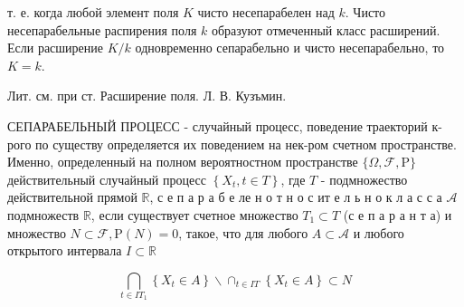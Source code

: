\documentclass[10pt]{article}
\begin{document}
т. е. когда любой элемент поля $K$ чисто несепарабелен над $k$. Чисто несепарабельные распирения поля $k$ образуют отмеченный класс расширений. Если расширение $K / k$ одновременно сепарабельно и чисто несепарабельно, то $K=k$.



Лит. см. при ст. Расширение поля. Л. В. Кузъмин.



СЕПАРАБЕЛЬНЫЙ ПРОЦЕСС - случайный процесс, поведение траекторий к-рого по существу определяется их поведением на нек-ром счетном пространстве. Именно, определенный на полном вероятностном пространстве $\{\Omega, \mathscr{F}, \mathrm{P}\}$ действительный случайный процесс $\left\{X_{t}, t \in T\right\}$, где $T$ - подмножество действительной прямой $\mathbb{R}$, с е п а р а б е ле н о т н о с ит е л ь н о к л а с с а $\mathcal{A}$ подмножеств $\mathbb{R}$, если существует счетное множество $T_{1} \subset T$ (с е п а р а н т а) и множество $N \subset \mathcal{F}, \mathrm{P}(N)=0$, такое, что для любого $A \subset \mathcal{A}$ и любого открытого интервала $I \subset \mathbb{R}$



\[

\bigcap_{t \in I T_{1}}\left\{X_{t} \in A\right\} \backslash \cap_{t \in I T}\left\{X_{t} \in A\right\} \subset N

\]
\end{document}
